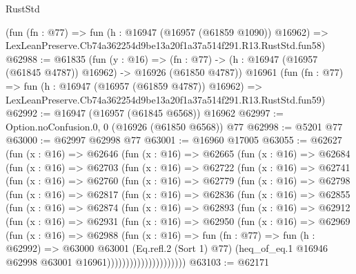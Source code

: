 \begin{lexlean}{RustStd}
\begin{coremodule}
    (fun (fn : @77) =>
    fun (h : @16947 (@16957 (@61859 @1090)) @16962) =>
    LexLeanPreserve.Cb74a362254d9be13a20f1a37a514f291.R13.RustStd.fun58)
@62988 := @61835
    (fun (y : @16) =>
    (fn : @77) -> (h : @16947 (@16957 (@61845 @4787)) @16962) -> @16926 (@61850 @4787))
    @16961
    (fun (fn : @77) =>
    fun (h : @16947 (@16957 (@61859 @4787)) @16962) =>
    LexLeanPreserve.Cb74a362254d9be13a20f1a37a514f291.R13.RustStd.fun59)
@62992 := @16947 (@16957 (@61845 @6568)) @16962
@62997 := Option.noConfusion.{0, 0} (@16926 (@61850 @6568)) @77
@62998 := @5201 @77
@63000 := @62997 @62998 @77
@63001 := @16960 @17005
@63055 := @62627
    (fun (x : @16) =>
    @62646
      (fun (x : @16) =>
      @62665
        (fun (x : @16) =>
        @62684
          (fun (x : @16) =>
          @62703
            (fun (x : @16) =>
            @62722
              (fun (x : @16) =>
              @62741
                (fun (x : @16) =>
                @62760
                  (fun (x : @16) =>
                  @62779
                    (fun (x : @16) =>
                    @62798
                      (fun (x : @16) =>
                      @62817
                        (fun (x : @16) =>
                        @62836
                          (fun (x : @16) =>
                          @62855
                            (fun (x : @16) =>
                            @62874
                              (fun (x : @16) =>
                              @62893
                                (fun (x : @16) =>
                                @62912
                                  (fun (x : @16) =>
                                  @62931
                                    (fun (x : @16) =>
                                    @62950
                                      (fun (x : @16) =>
                                      @62969
                                        (fun (x : @16) =>
                                        @62988
                                          (fun (x : @16) =>
                                          fun (fn : @77) =>
                                          fun (h : @62992) =>
                                          @63000
                                            @63001
                                            (Eq.refl.{2} (Sort 1) @77)
                                            (heq_of_eq.{1}
                                              @16946
                                              @62998
                                              @63001
                                              @16961)))))))))))))))))))))
@63103 := @62171

\end{coremodule}
\end{lexlean}
